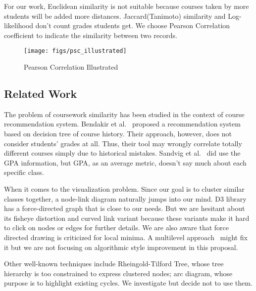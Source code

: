 For our work, Euclidean similarity is not suitable because courses taken by more students will be added more distances. Jaccard(Tanimoto) similarity and Log-likelihood don’t count grades students get. We choose Pearson Correlation coefficient to indicate the similarity between two records. 
\begin{figure}[h]
 \centering %
 \texttt{[image: figs/psc\_illustrated]}
\caption{Pearson Correlation Illustrated}
 \label{fig:psc}
\end{figure}
\subsection{Related Work}
\label{sec:related}

The problem of coursework similarity has been studied in the context of course recommendation system. Bendakir et al.~\cite{bendakir2006using} proposed a recommendation system based on decision tree of course history. Their approach, however, does not consider students' grades at all. Thus, their tool may wrongly correlate totally different courses simply due to historical mistakes. Sandvig et al.~\cite{sandvig2005aacorn} did use the GPA information, but GPA, as an average metric, doesn't say much about each specific class. 

When it comes to the visualization problem. Since our goal is to cluster similar classes together, a node-link diagram naturally jumps into our mind. D3 library has a force-directed graph that is close to our needs. But we are hesitant about its fisheye distortion and curved link variant because these variants make it hard to click on nodes or edges for further details. We are also aware that force directed drawing is criticized for local minima. A multilevel approach~\cite{walshaw2000multilevel} might fix it but we are not focusing on algorithmic style improvement in this proposal.

Other well-known techniques include Rheingold-Tilford Tree, whose tree hierarchy is too constrained to express clustered nodes; arc diagram, whose purpose is to highlight existing cycles. We investigate but decide not to use them. 

